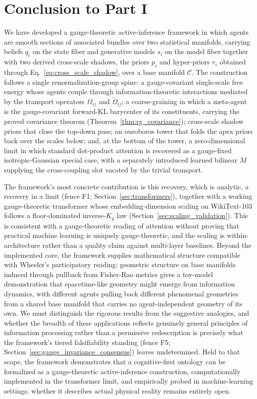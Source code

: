 \documentclass[11pt]{article}
\begin{document}
\section{Conclusion to Part I}\label{sec:conclusion}

We have developed a gauge-theoretic active-inference framework in which agents are smooth sections of associated bundles over two statistical manifolds, carrying beliefs $q_i$ on the state fiber and generative models $s_i$ on the model fiber together with two derived cross-scale shadows, the priors $p_i$ and hyper-priors $r_i$ obtained through Eq.~\eqref{eq:cross_scale_shadow}, over a base manifold $\mathcal{C}$. The construction follows a single renormalization-group spine: a gauge-covariant single-scale free energy whose agents couple through information-theoretic interactions mediated by the transport operators $\Omega_{ij}$ and $\tilde\Omega_{ij}$; a coarse-graining in which a meta-agent is the gauge-covariant forward-KL barycenter of its constituents, carrying the proved covariance theorem (Theorem~\ref{thm:rg_covariance}); cross-scale shadow priors that close the top-down pass; an ouroboros tower that folds the apex priors back over the scales below; and, at the bottom of the tower, a zero-dimensional limit in which standard dot-product attention is recovered as a gauge-fixed isotropic-Gaussian special case, with a separately introduced learned bilinear $M$ supplying the cross-coupling slot vacated by the trivial transport.

The framework's most concrete contribution is this recovery, which is analytic, a recovery in a limit (fence F1; Section~\ref{sec:transformers}), together with a working gauge-theoretic transformer whose embedding-dimension scaling on WikiText-103 follows a floor-dominated inverse-$K_q$ law (Section~\ref{sec:scaling_validation}). This is consistent with a gauge-theoretic reading of attention without proving that practical machine learning is uniquely gauge-theoretic, and the scaling is within-architecture rather than a quality claim against multi-layer baselines. Beyond the implemented core, the framework supplies mathematical structure compatible with Wheeler's participatory reading: geometric structure on base manifolds induced through pullback from Fisher-Rao metrics gives a toy-model demonstration that spacetime-like geometry might emerge from information dynamics, with different agents pulling back different phenomenal geometries from a shared base manifold that carries no agent-independent geometry of its own. We must distinguish the rigorous results from the suggestive analogies, and whether the breadth of these applications reflects genuinely general principles of information processing rather than a permissive redescription is precisely what the framework's tiered falsifiability standing (fence F5; Section~\ref{sec:gauge_invariance_consensus}) leaves undetermined. Held to that scope, the framework demonstrates that a cognitive-first ontology can be formalized as a gauge-theoretic active-inference construction, computationally implemented in the transformer limit, and empirically probed in machine-learning settings; whether it describes actual physical reality remains entirely open.
\end{document}
